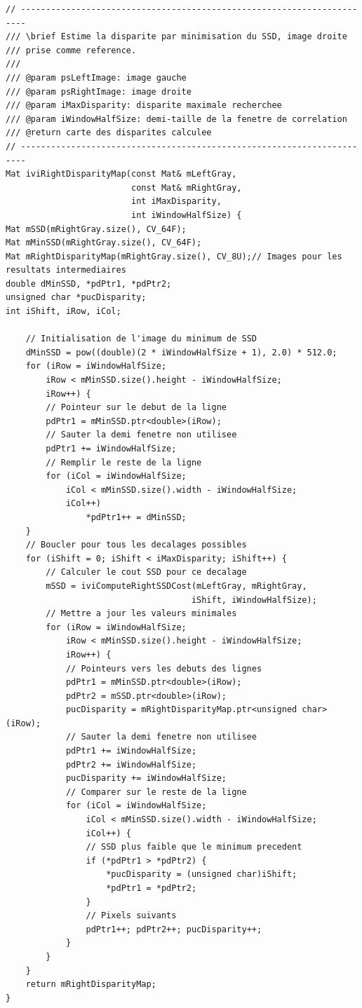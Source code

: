 \documentclass[a4paper]{article}
\begin{document}
\begin{lstlisting}
// -----------------------------------------------------------------------
/// \brief Estime la disparite par minimisation du SSD, image droite
/// prise comme reference.
///
/// @param psLeftImage: image gauche
/// @param psRightImage: image droite
/// @param iMaxDisparity: disparite maximale recherchee
/// @param iWindowHalfSize: demi-taille de la fenetre de correlation
/// @return carte des disparites calculee
// -----------------------------------------------------------------------
Mat iviRightDisparityMap(const Mat& mLeftGray,
                         const Mat& mRightGray,
                         int iMaxDisparity,
                         int iWindowHalfSize) {
Mat mSSD(mRightGray.size(), CV_64F);
Mat mMinSSD(mRightGray.size(), CV_64F);
Mat mRightDisparityMap(mRightGray.size(), CV_8U);// Images pour les resultats intermediaires
double dMinSSD, *pdPtr1, *pdPtr2;
unsigned char *pucDisparity;
int iShift, iRow, iCol;

    // Initialisation de l'image du minimum de SSD
    dMinSSD = pow((double)(2 * iWindowHalfSize + 1), 2.0) * 512.0;
    for (iRow = iWindowHalfSize;
        iRow < mMinSSD.size().height - iWindowHalfSize;
        iRow++) {
        // Pointeur sur le debut de la ligne
        pdPtr1 = mMinSSD.ptr<double>(iRow);
        // Sauter la demi fenetre non utilisee
        pdPtr1 += iWindowHalfSize;
        // Remplir le reste de la ligne
        for (iCol = iWindowHalfSize;
            iCol < mMinSSD.size().width - iWindowHalfSize;
            iCol++)
                *pdPtr1++ = dMinSSD;
    }
    // Boucler pour tous les decalages possibles
    for (iShift = 0; iShift < iMaxDisparity; iShift++) {
        // Calculer le cout SSD pour ce decalage
        mSSD = iviComputeRightSSDCost(mLeftGray, mRightGray,
                                     iShift, iWindowHalfSize);
        // Mettre a jour les valeurs minimales
        for (iRow = iWindowHalfSize;
            iRow < mMinSSD.size().height - iWindowHalfSize;
            iRow++) {
            // Pointeurs vers les debuts des lignes
            pdPtr1 = mMinSSD.ptr<double>(iRow);
            pdPtr2 = mSSD.ptr<double>(iRow);
            pucDisparity = mRightDisparityMap.ptr<unsigned char>(iRow);
            // Sauter la demi fenetre non utilisee
            pdPtr1 += iWindowHalfSize;
            pdPtr2 += iWindowHalfSize;
            pucDisparity += iWindowHalfSize;
            // Comparer sur le reste de la ligne
            for (iCol = iWindowHalfSize;
                iCol < mMinSSD.size().width - iWindowHalfSize;
                iCol++) {
                // SSD plus faible que le minimum precedent
                if (*pdPtr1 > *pdPtr2) {
                    *pucDisparity = (unsigned char)iShift;
                    *pdPtr1 = *pdPtr2;
                }
                // Pixels suivants
                pdPtr1++; pdPtr2++; pucDisparity++;
            }
        }
    }
    return mRightDisparityMap;
}
\end{lstlisting}
\end{document}
